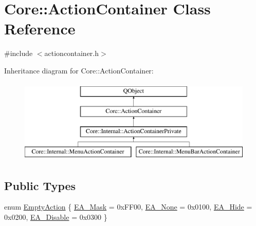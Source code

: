 \hypertarget{class_core_1_1_action_container}{\section{Core\-:\-:Action\-Container Class Reference}
\label{class_core_1_1_action_container}
}


{\ttfamily \#include $<$actioncontainer.\-h$>$}

Inheritance diagram for Core\-:\-:Action\-Container\-:\begin{figure}[H]
\begin{center}
\leavevmode
\includegraphics[height=4.000000cm]{class_core_1_1_action_container}
\end{center}
\end{figure}
\subsection*{Public Types}
\begin{DoxyCompactItemize}
\item 
enum \hyperlink{group___core_plugin_ga25957afb898f645827d8e7949c831327}{Empty\-Action} \{ \hyperlink{group___core_plugin_gga25957afb898f645827d8e7949c831327af1a70360b274cf469d7fd0a42007e614}{E\-A\-\_\-\-Mask} = 0x\-F\-F00, 
\hyperlink{group___core_plugin_gga25957afb898f645827d8e7949c831327a2492c1e5772bc04b21150f29a3620354}{E\-A\-\_\-\-None} = 0x0100, 
\hyperlink{group___core_plugin_gga25957afb898f645827d8e7949c831327aed8a4c98f66c29197b772529c4959190}{E\-A\-\_\-\-Hide} = 0x0200, 
\hyperlink{group___core_plugin_gga25957afb898f645827d8e7949c831327aefaf5abf9c05ed2a6a6b75b2c1824186}{E\-A\-\_\-\-Disable} = 0x0300
 \}
\end{DoxyCompactItemize}
